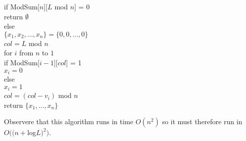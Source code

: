 \documentclass{article}
\begin{document}
\begin{enumerate}
\begin{tabbing}
\>if ModSum[$n$][$L$ mod $n$] = 0\\
\>\>return $\emptyset $\\
\>else\\
\>\>$\{x_1,x_2,\ldots ,x_n\}=\{0,0,\ldots ,0\}$\\
\>\>$col = L$ mod $n$\\
\>\>for $i$ from $n$ to $1$\\
\>\>\>if ModSum[$i-1$][$col$] = 1\\
\>\>\>\>$x_i=0$\\
\>\>\>else\\
\>\>\>\>$x_i=1$\\
\>\>\>\>$col = (col-v_i)$ mod $n$\\
\>\>return $\{x_1,\ldots ,x_n\}$\\
\end{tabbing}
Observere that this algorithm runs in time $O(n^2)$ so it must therefore run in $O((n+$log$L)^2)$.
\end{enumerate}
\end{document}

